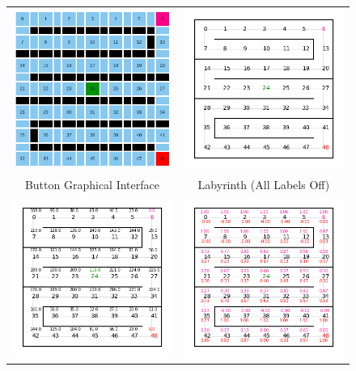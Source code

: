 \begin{figure}[H]
    \begin{tabular}{cc}
      \includegraphics[width=70mm]{../pictures/interface.png} &   \includegraphics[width=70mm]{../pictures/216-1.png} \\
    Button Graphical Interface & Labyrinth (All Labels Off) \\[6pt]
     \includegraphics[width=70mm]{../pictures/216-2.png} &   \includegraphics[width=70mm]{../pictures/216-3.png} \\

\end{tabular}
\end{figure}

